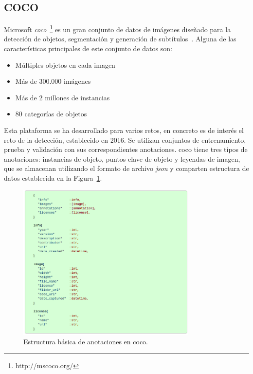 \subsection{COCO}
Microsoft \textit{\acrfull{coco}}~\footnote{http://mscoco.org/} es un gran conjunto de datos de imágenes diseñado para la detección de objetos, segmentación y generación de subtítulos~\cite{veit2016cocotext}. Alguna de las características principales de este conjunto de datos son:
	\begin{itemize}
         \item Múltiples objetos en cada imagen
     	 \item Más de 300.000 imágenes
         \item Más de 2 millones de instancias
         \item 80 categorías de objetos
    \end{itemize}
    
Esta plataforma se ha desarrollado para varios retos, en concreto es de interés el reto de la detección, establecido en 2016. Se utilizan conjuntos de entrenamiento, prueba y validación con sus correspondientes anotaciones. \acrshort{coco} tiene tres tipos de anotaciones: instancias de objeto, puntos clave de objeto y leyendas de imagen, que se almacenan utilizando el formato de archivo \textit{\acrfull{json}} y comparten estructura de datos establecida en la Figura~\ref{fig.basicStruc}. \\

\begin{figure}[H]
	\begin{center}
		\includegraphics[width=0.8\textwidth]{figures/basic_structure_annotations.png}
		\caption{Estructura básica de anotaciones en \acrshort{coco}.}
		\label{fig.basicStruc}
	\end{center}
\end{figure} 

